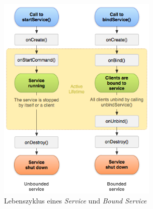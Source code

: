 \documentclass[]{report}
\begin{document}
\begin{figure}
    \centering 
    \includegraphics[width=3.0in]{bilder/boundservice.png}
    \caption{Lebenszyklus eines \textit{Service} und \textit{Bound Service} \cite{android}}
    \label{fig:lifetime}
\end{figure}
\end{document}
